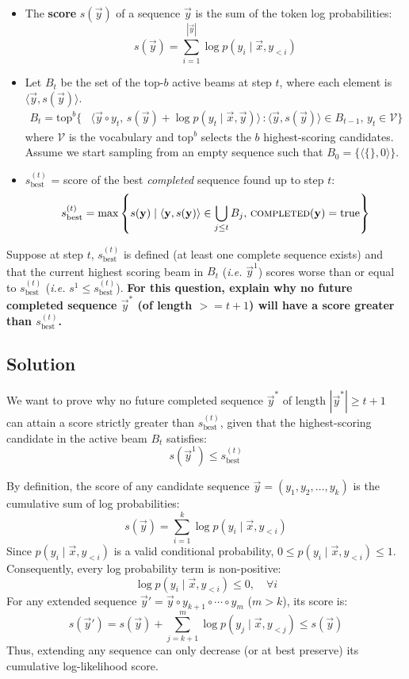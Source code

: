 \documentclass[11pt,english]{article}
\begin{document}
\begin{enumerate}[resume]
\begin{itemize}
    \item The \textbf{score} $s(\vec{y})$ of a sequence $\vec{y}$ is the sum of the token log probabilities:
    $$s(\vec{y}) = \sum_{i=1}^{|\vec{y}|} \log p(y_i \mid \vec{x}, y_{<i})$$
    
    \item Let $B_t$ be the set of the top-$b$ active beams at step $t$, where each element is $\langle \vec{y}, s(\vec{y}) \rangle$.
    \begin{align*}
        B_t = \text{top}^b \Big\{ & \langle \vec{y} \circ y_t, \, s(\vec{y}) + \log p(y_t \mid \vec{x}, \vec{y}) \rangle \, :
        \langle \vec{y}, s(\vec{y}) \rangle \in B_{t-1}, \, y_t \in \mathcal{V} \Big\}
    \end{align*}
    where $\mathcal{V}$ is the vocabulary and $\text{top}^b$ selects the $b$ highest-scoring candidates. Assume we start sampling from an empty sequence such that $B_0 = \{\langle \{\}, 0 \rangle\}$.
    
    \item $s_{\text{best}}^{(t)}$ = score of the best \emph{completed} sequence found up to step $t$:
    $$s_{\text{best}}^{(t)} = \max \left\{ s(\vec{y}) \mid \langle \vec{y}, s(\vec{y}) \rangle \in \bigcup_{j \leq t} B_j, \, \textsc{completed}(\vec{y}) = \text{true} \right\}$$
\end{itemize}

Suppose at step $t$, $s_{\text{best}}^{(t)}$ is defined (at least one complete sequence exists) and that the current highest scoring beam in $B_t$ (\emph{i.e.} $\vec{y}^1$) scores worse than or equal to $s_{\text{best}}^{(t)}$ (\emph{i.e.} $s^1 \leq s_{\text{best}}^{(t)}$).
\textbf{For this question, explain why no future completed sequence $\vec{y}^*$ (of length $>=t+1$) will have a score greater than $s_{\text{best}}^{(t)}$.} 


\subsection*{Solution}

We want to prove why no future completed sequence $\vec{y}^*$ of length $|\vec{y}^*| \ge t+1$ can attain a score strictly greater than $s_{\text{best}}^{(t)}$, given that the highest-scoring candidate in the active beam $B_t$ satisfies:
\[
s(\vec{y}^1) \le s_{\text{best}}^{(t)}
\]


By definition, the score of any candidate sequence $\vec{y} = (y_1, y_2, \ldots, y_k)$ is the cumulative sum of log probabilities:
\[
s(\vec{y}) = \sum_{i=1}^k \log p(y_i \mid \vec{x}, y_{<i})
\]
Since $p(y_i \mid \vec{x}, y_{<i})$ is a valid conditional probability, $0 \le p(y_i \mid \vec{x}, y_{<i}) \le 1$. Consequently, every log probability term is non-positive:
\[
\log p(y_i \mid \vec{x}, y_{<i}) \le 0, \quad \forall i
\]
For any extended sequence $\vec{y}' = \vec{y} \circ y_{k+1} \circ \cdots \circ y_m$ ($m > k$), its score is:
\[
s(\vec{y}') = s(\vec{y}) + \sum_{j=k+1}^m \log p(y_j \mid \vec{x}, y_{<j}) \le s(\vec{y})
\]
Thus, extending any sequence can only decrease (or at best preserve) its cumulative log-likelihood score.


\end{enumerate}
\end{document}
